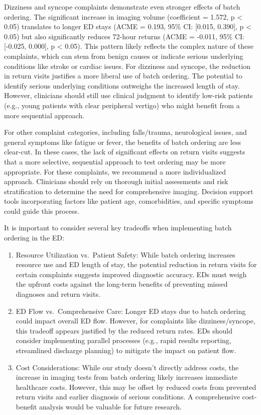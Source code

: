 \documentclass[,,nonblindrev]{informs}
\begin{document}
Dizziness and syncope complaints demonstrate even stronger effects of
batch ordering. The significant increase in imaging volume (coefficient
= 1.572, p \textless{} 0.05) translates to longer ED stays (ACME =
0.193, 95\% CI: {[}0.015, 0.390{]}, p \textless{} 0.05) but also
significantly reduces 72-hour returns (ACME = -0.011, 95\% CI:
{[}-0.025, 0.000{]}, p \textless{} 0.05). This pattern likely reflects
the complex nature of these complaints, which can stem from benign
causes or indicate serious underlying conditions like stroke or cardiac
issues. For dizziness and syncope, the reduction in return visits
justifies a more liberal use of batch ordering. The potential to
identify serious underlying conditions outweighs the increased length of
stay. However, clinicians should still use clinical judgment to identify
low-risk patients (e.g., young patients with clear peripheral vertigo)
who might benefit from a more sequential approach.

For other complaint categories, including falls/trauma, neurological
issues, and general symptoms like fatigue or fever, the benefits of
batch ordering are less clear-cut. In these cases, the lack of
significant effects on return visits suggests that a more selective,
sequential approach to test ordering may be more appropriate. For these
complaints, we recommend a more individualized approach. Clinicians
should rely on thorough initial assessments and risk stratification to
determine the need for comprehensive imaging. Decision support tools
incorporating factors like patient age, comorbidities, and specific
symptoms could guide this process.

It is important to consider several key tradeoffs when implementing
batch ordering in the ED:

\begin{enumerate}
\def\labelenumi{\arabic{enumi}.}
\item
  Resource Utilization vs.~Patient Safety: While batch ordering
  increases resource use and ED length of stay, the potential reduction
  in return visits for certain complaints suggests improved diagnostic
  accuracy. EDs must weigh the upfront costs against the long-term
  benefits of preventing missed diagnoses and return visits.
\item
  ED Flow vs.~Comprehensive Care: Longer ED stays due to batch ordering
  could impact overall ED flow. However, for complaints like
  dizziness/syncope, this tradeoff appears justified by the reduced
  return rates. EDs should consider implementing parallel processes
  (e.g., rapid results reporting, streamlined discharge planning) to
  mitigate the impact on patient flow.
\item
  Cost Considerations: While our study doesn't directly address costs,
  the increase in imaging tests from batch ordering likely increases
  immediate healthcare costs. However, this may be offset by reduced
  costs from prevented return visits and earlier diagnosis of serious
  conditions. A comprehensive cost-benefit analysis would be valuable
  for future research.
\end{enumerate}
\end{document}

